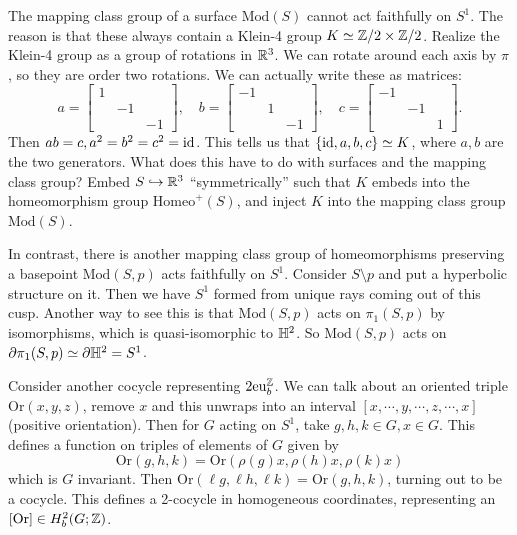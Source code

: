 \begin{example}
    The mapping class group of a surface $\mathrm{Mod}(S)$ cannot act faithfully on $S^1 $. The reason is that these always contain a Klein-4 group $K \simeq  \mathbb{Z}/2 \times \mathbb{Z}/2$. Realize the Klein-4 group as a group of rotations in $\mathbb{R}^3$. We can rotate around each axis by $\pi$, so they are order two rotations. We can actually write these as matrices: \[
        a=
        \begin{bmatrix}
            1 & & \\ & -1 & \\ & & -1
        \end{bmatrix},\quad
        b=
        \begin{bmatrix}
            -1 & & \\ & 1 & \\ & & -1
        \end{bmatrix},\quad
        c=
        \begin{bmatrix}
            -1 & & \\ & -1 & \\ & & 1
        \end{bmatrix}.
    \] Then $ab=c, a^2=b^2=c^2=\operatorname{id}$. This tells us that $\{\operatorname{id},a,b,c\}\simeq  K $, where $a,b$ are the two generators. What does this have to do with surfaces and the mapping class group? Embed $S \hookrightarrow  \mathbb{R}^3$ ``symmetrically'' such that $K$ embeds into the homeomorphism group $\mathrm{Homeo}^+(S)$, and inject $K$ into the mapping class group $\mathrm{Mod}(S)$.
     
    In contrast, there is another mapping class group of homeomorphisms preserving a basepoint $\mathrm{Mod}(S,p)$ acts faithfully on $S^1 $. Consider $S \setminus p$ and put a hyperbolic structure on it. Then we have $S^1 $ formed from unique rays coming out of this cusp. Another way to see this is that $\mathrm{Mod}(S,p)$ acts on $\pi_1(S,p)$ by isomorphisms, which is quasi-isomorphic to $\mathbb{H}^2$. So $\mathrm{Mod}(S,p)$ acts on $\partial  \pi_1 (S,p) \simeq  \partial \mathbb{H}^2=S^1 $.
\end{example}
Consider another cocycle representing $2\mathrm{eu}_b ^{\mathbb{Z}}$. We can talk about an oriented triple $\mathrm{Or}(x,y,z)$, remove $x$ and this unwraps into an interval $[x, \cdots , y , \cdots , z, \cdots ,x]$ (positive orientation). Then for $G$ acting on $S^1 $, take $g,h,k \in G, x \in G$. This defines a function on triples of elements of $G$ given by \[
    \mathrm{Or}(g,h,k) = \mathrm{Or}(\rho(g)x,\rho(h)x,\rho(k)x)
\] which is $G$ invariant. Then $\mathrm{Or}(\ell g, \ell h, \ell k)= \mathrm{Or}(g,h,k)$, turning out to be a cocycle. This defines a 2-cocycle in homogeneous coordinates, representing an $[\mathrm{Or}] \in  H^2_b(G;\mathbb{Z})$. 
